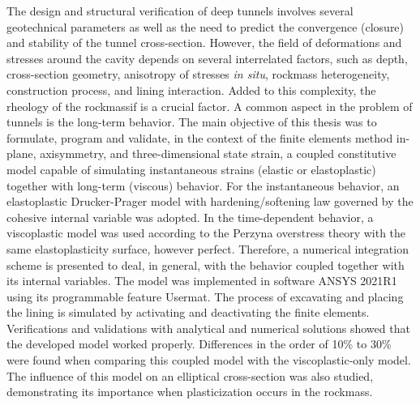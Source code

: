The design and structural verification of deep tunnels involves several geotechnical parameters as well as the need to predict the convergence (closure) and stability of the tunnel cross-section. However, the field of deformations and stresses around the cavity depends on several interrelated factors, such as depth, cross-section geometry, anisotropy of stresses \textit{in situ}, rockmass heterogeneity, construction process, and lining interaction. Added to this complexity, the rheology of the rockmassif is a crucial factor. A common aspect in the problem of tunnels is the long-term behavior. The main objective of this thesis was to formulate, program and validate, in the context of the finite elements method in-plane, axisymmetry, and three-dimensional state strain, a coupled constitutive model capable of simulating instantaneous strains (elastic or elastoplastic) together with long-term (viscous) behavior. For the instantaneous behavior, an elastoplastic Drucker-Prager model with hardening/softening law governed by the cohesive internal variable was adopted. In the time-dependent behavior, a viscoplastic model was used according to the Perzyna overstress theory with the same elastoplasticity surface, however perfect. Therefore, a numerical integration scheme is presented to deal, in general, with the behavior coupled together with its internal variables. The model was implemented in software ANSYS 2021R1 using its programmable feature Usermat. The process of excavating and placing the lining is simulated by activating and deactivating the finite elements. Verifications and validations with analytical and numerical solutions showed that the developed model worked properly. Differences in the order of 10\% to 30\% were found when comparing this coupled model with the viscoplastic-only model. The influence of this model on an elliptical cross-section was also studied, demonstrating its importance when plasticization occurs in the rockmass.
